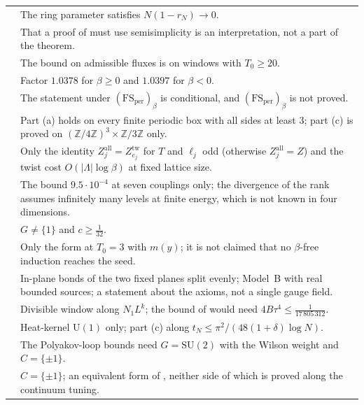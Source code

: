 \documentclass[11pt,a4paper]{amsart}
\theoremstyle{definition}
\theoremstyle{remark}
\numberwithin{equation}{section}
\newcommand{\Z}{\mathbb{Z}}          %
\newcommand{\abs}[1]{\lvert #1\rvert}      %
\newcommand{\SU}{\mathrm{SU}}              %
\newcommand{\U}{\mathrm{U}}                %
\newcommand{\Mcirc}{\text{\upshape(M$^{\circ}$)}}   %
\newcommand{\Tzero}{T_0}                   %
\begin{document}
{\begin{longtable}{@{}p{}p{}@{}}
{prop:relativization} & The ring parameter satisfies $N(1-r_N)\to0$.\\
{thm:semisimplicity} & That a proof of \Mcirc{} must use semisimplicity is an interpretation, not a part of the theorem.\\
{thm:no-convexity} & The bound on admissible fluxes is on windows with $\Tzero\ge20$.\\
{thm:BE-line-field} & Factor $1.0378$ for $\beta\ge0$ and $1.0397$ for $\beta<0$.\\
{thm:abelian} & The statement under $(\mathrm{FS}_{\mathrm{per}})_\beta$ is conditional, and $(\mathrm{FS}_{\mathrm{per}})_\beta$ is not proved.\\
{thm:pseudoreality} & Part (a) holds on every finite periodic box with all sides at least $3$; part (c) is proved on $(\Z/4\Z)^3\times\Z/3\Z$ only.\\
{prop:chessboard} & Only the identity $Z^{\mathrm{all}}_j=Z^{\mathrm{tw}}_{e_j}$ for $T$ and $\ell_j$ odd (otherwise $Z^{\mathrm{all}}_j=Z$) and the twist cost $O(\abs\Lambda\log\beta)$ at fixed lattice size.\\
{thm:finite-rank-obstruction} & The bound $9.5\cdot10^{-4}$ at seven couplings only; the divergence of the rank assumes infinitely many levels at finite energy, which is not known in four dimensions.\\
{prop:trivialising-maps} & $G\ne\{1\}$ and $c\ge\frac1{32}$.\\
{thm:universal-step} & Only the form at $\Tzero=3$ with $m(y)$; it is not claimed that no $\beta$-free induction reaches the seed.\\
{thm:non-implication} & In-plane bonds of the two fixed planes split evenly; Model~B with real bounded sources; a statement about the axioms, not a single gauge field.\\
{prop:balaban-constant} & Divisible window along $N_1L^k$; the bound of \cite{balaban1989b} would need $4B\tau^4\le\frac1{17\,805\,312}$.\\
{prop:abelian-neutral} & Heat-kernel $\U(1)$ only; part (c) along $t_N\le\pi^2/(48(1+\delta)\log N)$.\\
{prop:overlap-polyakov} & The Polyakov-loop bounds need $G=\SU(2)$ with the Wilson weight and $C=\{\pm1\}$.\\
{cor:hypercube-vortex} & $C=\{\pm1\}$; an equivalent form of \Mcirc{}, neither side of which is proved along the continuum tuning.\\

\end{longtable}}
\end{document}
